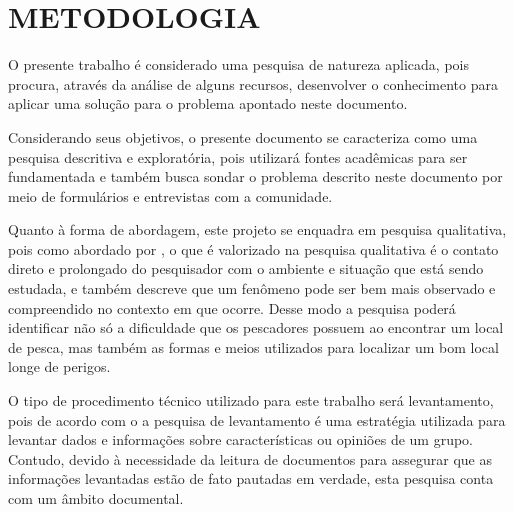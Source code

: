 
\chapter{METODOLOGIA}
\label{chap:metodologia}

O presente trabalho é considerado uma pesquisa de natureza aplicada, pois procura, através da análise de alguns recursos, desenvolver o conhecimento para aplicar uma solução para o problema apontado neste documento.

Considerando seus objetivos, o presente documento se caracteriza como uma pesquisa descritiva e exploratória, pois utilizará fontes acadêmicas para ser fundamentada e também busca sondar o problema descrito neste documento por meio de formulários e entrevistas com a comunidade.

Quanto à forma de abordagem, este projeto se enquadra em pesquisa qualitativa, pois como abordado por , o que é valorizado na pesquisa qualitativa é o contato direto e prolongado do pesquisador com o ambiente e situação que está sendo estudada, e também descreve que um fenômeno pode ser bem mais observado e compreendido no contexto em que ocorre. Desse modo a pesquisa poderá identificar não só a dificuldade que os pescadores possuem ao encontrar um local de pesca, mas também as formas e meios utilizados para localizar um bom local longe de perigos.

O tipo de procedimento técnico utilizado para este trabalho será levantamento, pois de acordo com o  a pesquisa de levantamento é uma estratégia utilizada para levantar dados e informações sobre características ou opiniões de um grupo. Contudo, devido à necessidade da leitura de documentos para assegurar que as informações levantadas estão de fato pautadas em verdade, esta pesquisa conta com um âmbito documental.



